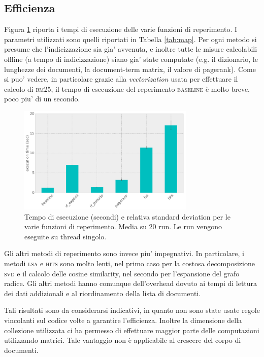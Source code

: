 \subsection{Efficienza}
\label{sec:efficienza}
Figura \ref{fig:efficiency} riporta i tempi di esecuzione delle varie funzioni di reperimento. I parametri utilizzati sono quelli riportati in Tabella \ref{tab:map}. Per ogni metodo si presume che l'indicizzazione sia gia' avvenuta, e inoltre tutte le misure calcolabili offline (a tempo di indicizzazione) siano gia' state computate (e.g. il dizionario, le lunghezze dei documenti, la document-term matrix, il valore di pagerank). Come si puo' vedere, in particolare grazie alla \textit{vectorization} usata per effettuare il calcolo di \textsc{bm25}, il tempo di esecuzione del reperimento \textsc{baseline} \`e molto breve, poco piu' di un secondo. 
\begin{figure}[htpb]
	\begin{center}
		\includegraphics[width=0.75\textwidth]{figures/efficiency.png}
		\caption{Tempo di esecuzione (secondi) e relativa standard deviation per le varie funzioni di reperimento. Media su 20 run. Le run vengono eseguite su thread singolo.}
		\label{fig:efficiency}
	\end{center}
\end{figure}
Gli altri metodi di reperimento sono invece piu' impegnativi. In particolare, i metodi \textsc{lsa} e \textsc{hits} sono molto lenti, nel primo caso per la costosa decomposizione \textsc{svd} e il calcolo delle cosine similarity, nel secondo per l'espansione del grafo radice. Gli altri metodi hanno comunque dell'overhead dovuto ai tempi di lettura dei dati addizionali e al riordinamento della lista di documenti.

Tali risultati sono da considerarsi indicativi, in quanto non sono state usate regole vincolanti sul codice volte a garantire l'efficienza. Inoltre la dimensione della collezione  utilizzata ci ha permesso di effettuare maggior parte delle computazioni utilizzando matrici. Tale vantaggio non \`e applicabile al crescere del corpo di documenti.

